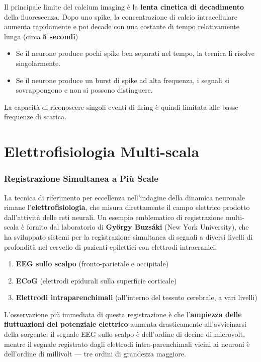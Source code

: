 Il principale limite del calcium imaging è la \textbf{lenta cinetica di decadimento} della fluorescenza. Dopo uno spike, la concentrazione di calcio intracellulare aumenta rapidamente e poi decade con una costante di tempo relativamente lunga (circa \textbf{5 secondi})

\begin{itemize}
    \item Se il neurone produce pochi spike ben separati nel tempo, la tecnica li risolve singolarmente.
    \item Se il neurone produce un burst di spike ad alta frequenza, i segnali si sovrappongono e non si possono distinguere.
\end{itemize}

La capacità di riconoscere singoli eventi di firing è quindi limitata alle basse frequenze di scarica.



\section{Elettrofisiologia Multi-scala}

\subsubsection{Registrazione Simultanea a Più Scale}

La tecnica di riferimento per eccellenza nell'indagine della dinamica neuronale rimane l'\textbf{elettrofisiologia}, che misura direttamente il campo elettrico prodotto dall'attività delle reti neurali. Un esempio emblematico di registrazione multi-scala è fornito dal laboratorio di \textbf{György Buzsáki} (New York University), che ha sviluppato sistemi per la registrazione simultanea di segnali a diversi livelli di profondità nel cervello di pazienti epilettici con elettrodi intracranici:

\begin{enumerate}
    \item \textbf{EEG sullo scalpo} (fronto-parietale e occipitale)
    \item \textbf{ECoG} (elettrodi epidurali sulla superficie corticale)
    \item \textbf{Elettrodi intraparenchimali} (all'interno del tessuto cerebrale, a vari livelli)
\end{enumerate}

L'osservazione più immediata di questa registrazione è che l'\textbf{ampiezza delle fluttuazioni del potenziale elettrico} aumenta drasticamente all'avvicinarsi della sorgente: il segnale EEG sullo scalpo è dell'ordine di decine di microvolt, mentre il segnale registrato dagli elettrodi intra-parenchimali vicini ai neuroni è dell'ordine di millivolt — tre ordini di grandezza maggiore.

